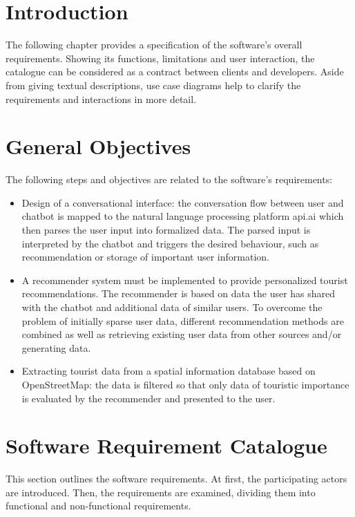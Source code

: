 
\section{Introduction}
The following chapter provides a specification of the software’s overall requirements. Showing its functions, limitations and user interaction, the catalogue can be considered as a contract between clients and developers. Aside from giving textual descriptions, use case diagrams help to clarify the requirements and interactions in more detail.


\section{General Objectives}
The following steps and objectives are related to the software's requirements:
\begin{itemize}
\item Design of a conversational interface: the conversation flow between user and chatbot is mapped to the natural language processing platform api.ai which then parses the user input into formalized data. The parsed input is interpreted by the chatbot and triggers the desired behaviour, such as recommendation or storage of important user information.

\item A recommender system must be implemented to provide personalized tourist recommendations. The recommender is based on data the user has shared with the chatbot and additional data of similar users. To overcome the problem of initially sparse user data, different recommendation methods are combined as well as retrieving existing user data from other sources and/or generating data.

\item Extracting tourist data from a spatial information database based on OpenStreetMap: the data is filtered so that only data of touristic importance is evaluated by the recommender and presented to the user.
\end{itemize}

\section{Software Requirement Catalogue}
This section outlines the software requirements. At first, the participating actors are introduced. Then, the requirements are examined, dividing them into functional and non-functional requirements. 

